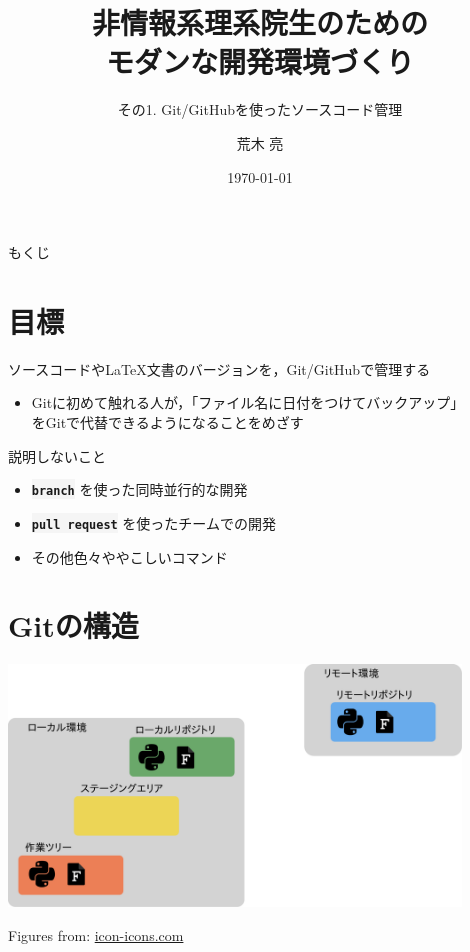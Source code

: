 \documentclass[12pt,dvipdfmx,svgnames,uplatex,aspectratio=169]{beamer}
\title{非情報系理系院生のための \\
  モダンな開発環境づくり}
\subtitle{その1. Git/GitHubを使ったソースコード管理}
\author{荒木 亮}
\institute{阪大院基礎工・後藤研}
\date{\today}
\newcommand{\git}[1]{{\colorbox{WhiteSmoke}{\texttt{\textbf{#1}}}}}  %
\begin{document}
\frame{\maketitle}
\begin{frame}{もくじ}
  \tableofcontents
\end{frame}

\section{目標}
\begin{frame}{\insertsection}
  \begin{screen}
    \centering
    ソースコードやLaTeX文書のバージョンを，Git/GitHubで管理する
  \end{screen}

  \begin{itemize}
    \item Gitに初めて触れる人が，「ファイル名に日付をつけてバックアップ」\\をGitで代替できるようになることをめざす
  \end{itemize}

  \begin{alertblock}{説明しないこと}
    \begin{itemize}
      \item \git{branch} を使った同時並行的な開発
      \item \git{pull request} を使ったチームでの開発
      \item その他色々ややこしいコマンド
    \end{itemize}
  \end{alertblock}
\end{frame}

\section{Gitの構造}
\begin{frame}{\insertsection}
  \centering
  \includegraphics[bb=0.000000 0.000000 979.966736 524.329163, width=120mm]{./pics/git_structure.pdf}
  \begin{flushright}
    \scriptsize{Figures from: \href{https://icon-icons.com/ja/}{icon-icons.com}}
  \end{flushright}
\end{frame}
\end{document}
